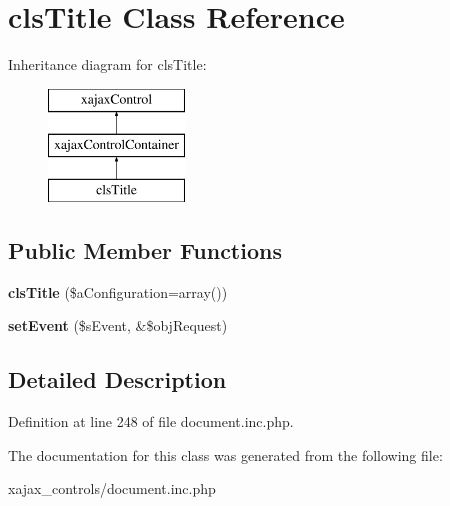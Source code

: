 \hypertarget{classclsTitle}{
\section{clsTitle Class Reference}
\label{classclsTitle}
}
Inheritance diagram for clsTitle:\begin{figure}[H]
\begin{center}
\leavevmode
\includegraphics[height=3.000000cm]{classclsTitle}
\end{center}
\end{figure}
\subsection*{Public Member Functions}
\begin{DoxyCompactItemize}
\item 
\hypertarget{classclsTitle_ad2a9a5a1c7c0db49bdc2f40da43aaa4e}{
{\bfseries clsTitle} (\$aConfiguration=array())}
\label{classclsTitle_ad2a9a5a1c7c0db49bdc2f40da43aaa4e}

\item 
\hypertarget{classclsTitle_a5fc889e46e41b7d5debd771cda2f9ff4}{
{\bfseries setEvent} (\$sEvent, \&\$objRequest)}
\label{classclsTitle_a5fc889e46e41b7d5debd771cda2f9ff4}

\end{DoxyCompactItemize}


\subsection{Detailed Description}


Definition at line 248 of file document.inc.php.



The documentation for this class was generated from the following file:\begin{DoxyCompactItemize}
\item 
xajax\_\-controls/document.inc.php\end{DoxyCompactItemize}
